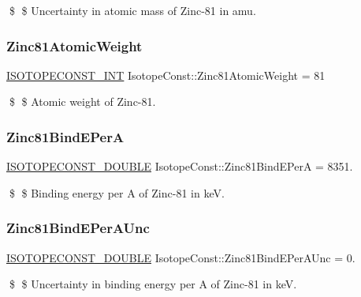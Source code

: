 \$ \$ Uncertainty in atomic mass of Zinc-\/81 in amu. \mbox{\label{group___isotope_const-_zinc-_zn81_gab380c8499bc1c6e14a3215f48f0e9f1e}} 
\subsubsection{\texorpdfstring{Zinc81\+Atomic\+Weight}{Zinc81AtomicWeight}}
{\footnotesize\ttfamily \mbox{\hyperlink{group___isotope_const-_macros_ga5f18360b3e99483a35c32d789e62621c}{I\+S\+O\+T\+O\+P\+E\+C\+O\+N\+S\+T\+\_\+\+I\+NT}} Isotope\+Const\+::\+Zinc81\+Atomic\+Weight = 81}

\$ \$ Atomic weight of Zinc-\/81. \mbox{\label{group___isotope_const-_zinc-_zn81_gad9632b1cc2eab13af997ead6ff457972}} 
\subsubsection{\texorpdfstring{Zinc81\+Bind\+E\+PerA}{Zinc81BindEPerA}}
{\footnotesize\ttfamily \mbox{\hyperlink{group___isotope_const-_macros_ga8f45a7272ce02c0b4c65c44636ed719a}{I\+S\+O\+T\+O\+P\+E\+C\+O\+N\+S\+T\+\_\+\+D\+O\+U\+B\+LE}} Isotope\+Const\+::\+Zinc81\+Bind\+E\+PerA = 8351.}

\$ \$ Binding energy per A of Zinc-\/81 in keV. \mbox{\label{group___isotope_const-_zinc-_zn81_gacedcbd2d77fed0d9c42449cbad42d650}} 
\subsubsection{\texorpdfstring{Zinc81\+Bind\+E\+Per\+A\+Unc}{Zinc81BindEPerAUnc}}
{\footnotesize\ttfamily \mbox{\hyperlink{group___isotope_const-_macros_ga8f45a7272ce02c0b4c65c44636ed719a}{I\+S\+O\+T\+O\+P\+E\+C\+O\+N\+S\+T\+\_\+\+D\+O\+U\+B\+LE}} Isotope\+Const\+::\+Zinc81\+Bind\+E\+Per\+A\+Unc = 0.}

\$ \$ Uncertainty in binding energy per A of Zinc-\/81 in keV. \mbox{\label{group___isotope_const-_zinc-_zn81_ga33813c9f4c0bafb7fbde186f64959591}} 
